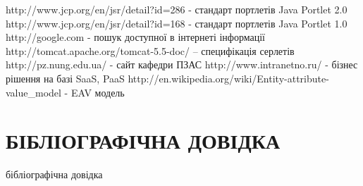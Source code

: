 \renewcommand{\refname}{СПИСОК ПОСИЛАНЬ НА ДЖЕРЕЛА}
\begin{thebibliography}{99}
 http://www.jcp.org/en/jsr/detail?id=286 - стандарт портлетів Java Portlet 2.0
 http://www.jcp.org/en/jsr/detail?id=168 - стандарт портлетів Java Portlet 1.0
 http://google.com - пошук доступної в інтернеті інформації
 http://tomcat.apache.org/tomcat-5.5-doc/ -- специфікація серлетів
 http://pz.nung.edu.ua/ - сайт кафедри ПЗАС
 http://www.intranetno.ru/ - бізнес рішення на базі SaaS, PaaS
 http://en.wikipedia.org/wiki/Entity-attribute-value\_model - EAV модель
\end{thebibliography}

\newpage
{} %


\section*{БІБЛІОГРАФІЧНА ДОВІДКА}
бібліографічна довідка



